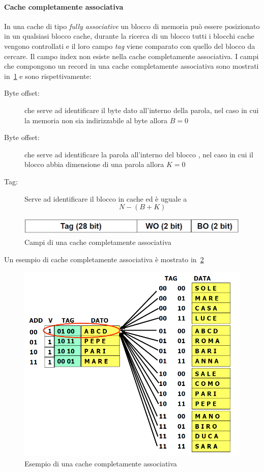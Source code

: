 \paragraph{Cache completamente associativa}
In una cache di tipo \emph{fully associative} un blocco di memoria può essere posizionato in un qualsiasi blocco cache, durante la ricerca di un blocco tutti i blocchi cache vengono controllati e il loro campo \emph{tag} viene comparato con quello del blocco da cercare. Il campo index non esiste nella cache completamente associativa.
I campi che compongono un record in una cache completamente associativa sono mostrati in \figurename\,\ref{fig:fullyaddressing} e sono rispettivamente:
\begin{description}
\item[Byte offset:] che serve ad identificare il byte dato all'interno della parola, nel caso in cui la memoria non sia indirizzabile al byte allora $B = 0$
\item[Byte offset:] che serve ad identificare la parola all'interno del blocco , nel caso in cui il blocco abbia dimensione di una parola allora $K = 0$
\item[Tag:] Serve ad identificare il blocco in cache ed è uguale a 
$$N - (B + K)$$
\end{description}
\begin{figure}[htb]
\centering
\includegraphics[scale=0.5]{img/fullyaddressing.png}
\caption{Campi di una cache completamente associativa}\label{fig:fullyaddressing}
\end{figure}
Un esempio di cache completamente associativa è mostrato in \figurename\,\ref{fig:fullyexemp}
\begin{figure}[htb]
\centering
\includegraphics[scale=0.5]{img/fullyexemp.png}
\caption{Esempio di una cache completamente associativa}\label{fig:fullyexemp}
\end{figure}
